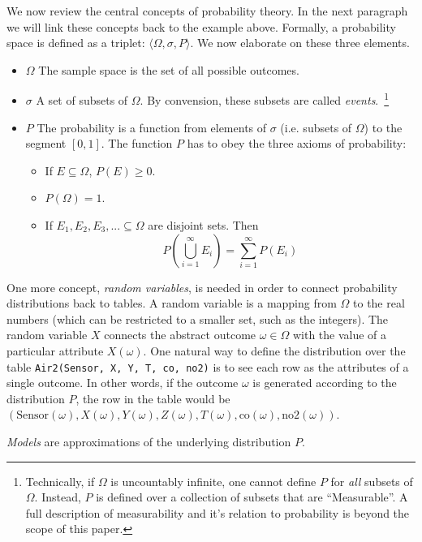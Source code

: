 We now review the central concepts of probability theory. In the next
paragraph we will link these concepts back to the example above.
Formally, a probability space is defined as a triplet: $\langle
\Omega, \sigma, P  \rangle$. We now elaborate on these three elements.
\begin{itemize}
\item {\bf $\Omega$} The sample space is the set of all possible outcomes.
\item {\bf $\sigma$} A set of subsets of
  $\Omega$. By convension, these subsets are called {\em events}.~\footnote{Technically, if $\Omega$ is uncountably
  infinite, one cannot define $P$ for {\em all} subsets of
  $\Omega$. Instead, $P$ is defined over a collection of subsets that
  are ``Measurable''. A full description of measurability and it's
  relation to probability is beyond the scope of this paper.}
\item {\bf $P$} The probability is a function from elements of
  $\sigma$ (i.e. subsets of $\Omega$) to the segment $[0,1]$. The function $P$
  has to obey the three axioms of probability:
\begin{itemize}
\item If $E \subseteq \Omega$, $P(E) \geq 0$.  
\item $P(\Omega)=1$.
\item If $E_1,E_2,E_3,... \subseteq \Omega$ are disjoint sets. Then 
$$ P\left(\bigcup_{i=1}^{\infty} E_i \right)=\sum_{i=1}^{\infty}
  P(E_i) $$
\end{itemize}
\end{itemize}

One more concept, {\em random variables}, is needed in order to
connect probability distributions back to tables. A random variable is
a mapping from $\Omega$ to the real numbers (which can be restricted
to a smaller set, such as the integers). The random variable $X$ connects
the abstract outcome $\omega \in \Omega$ with the value of a
particular attribute $X(\omega)$. One natural way to define the
distribution over the table \texttt{Air2(Sensor, X, Y, T, co,
  no2)} is to see each row as the attributes of a single outcome. In
other words, if the outcome $\omega$ is generated according to the
distribution $P$, the row in the table would be
$(\mbox{Sensor}(\omega),X(\omega),Y(\omega),Z(\omega),T(\omega),\mbox{co}(\omega),\mbox{no2}(\omega))$.

{\em Models} are approximations of the underlying distribution $P$.


